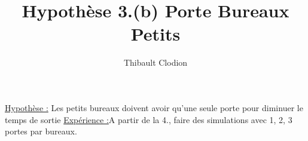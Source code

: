 \documentclass[12pt]{article}
\title{Hypothèse 3.(b) Porte Bureaux Petits}
\author{Thibault Clodion}
\begin{document}
\maketitle %

\underline{Hypothèse :} Les petits bureaux doivent avoir qu'une seule porte pour diminuer le temps de sortie
\newline\newline
\underline{Expérience :}A partir de la 4., faire des simulations avec 1, 2, 3 portes par bureaux.
\newline\newline
\end{document}
